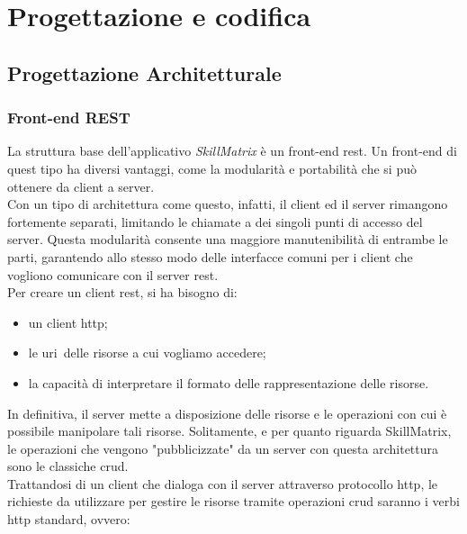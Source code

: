 
\chapter{Progettazione e codifica}
\label{cap:progettazione-codifica}

\section{Progettazione Architetturale}

\subsection{Front-end REST}
La struttura base dell'applicativo \emph{SkillMatrix} è un \gls{front-end} \gls{rest}. Un \gls{front-end} di quest tipo ha diversi vantaggi, come la modularità e portabilità che si può ottenere da client a server.\\
Con un tipo di architettura come questo, infatti, il client ed il server rimangono fortemente separati, limitando le chiamate a dei singoli punti di accesso del server. Questa modularità consente una maggiore manutenibilità di entrambe le parti, garantendo allo stesso modo delle interfacce comuni per i client che vogliono comunicare con il server \gls{rest}.\\
Per creare un client \gls{rest}, si ha bisogno di:
\begin{itemize}
	\item un client \gls{http};
	\item le \gls{uri}\glsfirstoccur\  delle risorse a cui vogliamo accedere;
	\item la capacità di interpretare il formato delle rappresentazione delle risorse.
\end{itemize}
In definitiva, il server mette a disposizione delle risorse e le operazioni con cui è possibile manipolare tali risorse. Solitamente, e per quanto riguarda SkillMatrix, le operazioni che vengono "pubblicizzate" da un server con questa architettura sono le classiche \gls{crud}.\\
Trattandosi di un client che dialoga con il server attraverso protocollo \gls{http}, le richieste da utilizzare per gestire le risorse tramite operazioni \gls{crud} saranno i verbi \gls{http} standard, ovvero:

